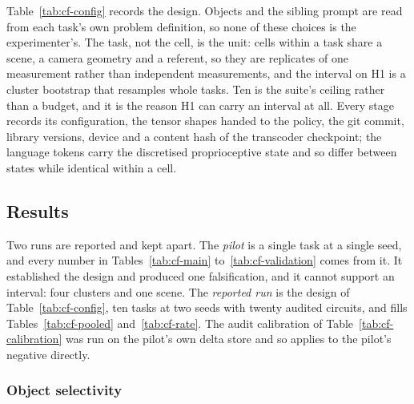 Table~\ref{tab:cf-config} records the design. Objects and the sibling prompt
are read from each task's own problem definition, so none of these choices is
the experimenter's. The task, not the cell, is the unit: cells within a task
share a scene, a camera geometry and a referent, so they are replicates of one
measurement rather than independent measurements, and the interval on H1 is a
cluster bootstrap that resamples whole tasks. Ten is the suite's ceiling rather
than a budget, and it is the reason H1 can carry an interval at all. Every stage records its configuration, the tensor shapes handed
to the policy, the git commit, library versions, device and a content hash of
the transcoder checkpoint; the language tokens carry the discretised
proprioceptive state and so differ between states while identical within a
cell.

\subsection{Results}

Two runs are reported and kept apart. The \emph{pilot} is a single task at a
single seed, and every number in Tables~\ref{tab:cf-main}
to~\ref{tab:cf-validation} comes from it. It established the design and
produced one falsification, and it cannot support an interval: four clusters
and one scene. The \emph{reported run} is the design of
Table~\ref{tab:cf-config}, ten tasks at two seeds with twenty audited
circuits, and fills Tables~\ref{tab:cf-pooled} and~\ref{tab:cf-rate}. The
audit calibration of Table~\ref{tab:cf-calibration} was run on the pilot's own
delta store and so applies to the pilot's negative directly.

\subsubsection{Object selectivity}

